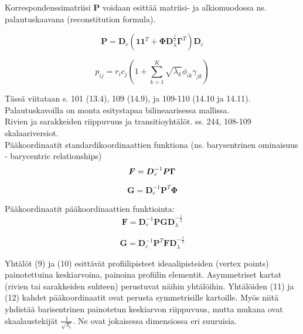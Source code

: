 \documentclass[12pt,a4paper,leqno]{article}
\theoremstyle{plain}
\theoremstyle{definition}
\theoremstyle{remark}
\begin{document}
Korrespondenssimatriisi $\boldsymbol{P}$ voidaan esittää matriisi- ja alkiomuodossa ns. palautuskaavana (reconstitution formula).

\begin{equation}
\boldsymbol{P} = \boldsymbol{D}_{r} \left( \boldsymbol{1}\boldsymbol{1}^{T} + \boldsymbol{\Phi}\boldsymbol{D}_{\lambda}^{\frac {1}{2}}\boldsymbol{\Gamma}^{T}\right)\boldsymbol{D}_{c}
\end{equation}

\begin{equation}
p_ {ij}= r_{i}c_{j} \left(1 + \sum_{k=1}^{K} \sqrt{\lambda_{k}} \phi_{ik} \gamma_{jk} \right)
\end{equation}

Tässä viitataan s. 101 (13.4), 109 (14.9), ja 109-110 (14.10 ja 14.11). Palautuskavoilla on monta esitystapaa bilineaarisessa mallissa.\\

Rivien ja sarakkeiden riippuvuus ja transitioyhtälöt. ss. 244, 108-109 skalaariversiot.\\

Pääkoordinaatit standardikoordinaattien funktiona (ns. barysentrinen ominaisuus - barycentric relationships)\\

\begin{equation}
\boldsymbol{F} = \boldsymbol{D}_{r}^{-1} \boldsymbol{P}\boldsymbol{\Gamma}\\
\end{equation}

\begin{equation}
\boldsymbol{G} = \boldsymbol{D}_{c}^{-1} \boldsymbol{P}^{T}\boldsymbol{\Phi}
\end{equation}

Pääkoordinaatit pääkoordinaattien funktiointa:\\

\begin{equation}
\boldsymbol{F} = \boldsymbol{D}_{r}^{-1} \boldsymbol{P}\boldsymbol{G}\boldsymbol{D}_{\lambda}^{-\frac{1}{2}}
\end{equation}

\begin{equation}
\boldsymbol{G} = \boldsymbol{D}_{c}^{-1} \boldsymbol{P}^{T}\boldsymbol{F}\boldsymbol{D}_{\lambda}^{-\frac{1}{2}}
\end{equation}

Yhtälöt (9) ja (10) esittävät profiilipisteet ideaalipisteiden (vertex points) painotettuina keskiarvoina, painoina profiilin elementit. Asymmetriset kartat (rivien tai sarakkeiden suhteen) perustuvat näihin yhtälöihin. Yhtälöiden (11) ja (12) kahdet pääkoordinaatit ovat perusta symmetrisille kartoille. Myös niitä yhdistää barisentrinen painotetun keskiarvon riippuvuus, mutta mukana ovat skaalaustekijät
 $\frac{1}{\sqrt{\lambda_{i}}}$. Ne ovat jokaisessa dimensiossa eri suuruisia.
\end{document}
